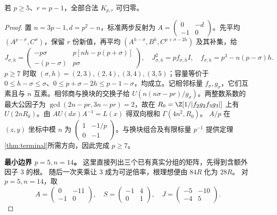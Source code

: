 \begin{lemma}\label{lem:upper-boundary}
若 $p\ge5$、$r=p-1$，全部合法 $K_{p,r}$ 可归零。
\end{lemma}
\begin{proof}
置 $n=3p-1,d=p^2-n$，标准两步反射为 $A=\left(\begin{smallmatrix}0&-d\\-1&0\end{smallmatrix}\right)$。先平均 $(A^{p-\sigma},C^\sigma)$，保留 $r$ 份新值，再平均 $(A^{h-\sigma},B^h,C^{p+\sigma-2h})$ 及其补集，给
\[
J_{\sigma,h}=\begin{pmatrix}-p\sigma&p[nh-p(p+\sigma)]\\-(p-\sigma)&p\sigma\end{pmatrix},
\quad J_{\sigma,h}^2=pf_{\sigma,h}I,\quad f_{\sigma,h}=p^3-n(p-\sigma)h.
\]
$p\ge7$ 时取 $(\sigma,h)=(2,3),(2,4),(3,4),(3,5)$；容量等价于 $0\le h-\sigma\le\sigma$、$0\le p+\sigma-2h\le p-1-\sigma$，均成立。记相邻标量 $f_\sigma,g_\sigma$，它们互素且与 $n$ 互素。相邻商与换块的交换子给 $U(n(n\sigma-pr)/g_\sigma)$。两整数系数的最大公因子为 $\gcd(2n-pr,3n-pr)=2$，故在 $R_0=\Z[1/|f_2g_2f_3g_3|]$ 上有 $U(2nR_0)$。由 $AU(dx)A^{-1}=L(x)$ 得双向根和 $\Gamma(4n^2,R_0)$。
$A/p$ 在 $(z,y)$ 坐标中模 $n$ 为 $\left(\begin{smallmatrix}1&-1/p\\0&-1\end{smallmatrix}\right)$。与换块组合及有限标量 $p^{-1}$ 提供定理\ref{thm:terminal}所需方向，因此完成 $p\ge7$。

\par\noindent\textbf{最小边界 $p=5,n=14$。}
这里直接列出三个已有真实分组的矩阵，先得到含额外因子 $3$ 的根。
随后一次夹乘让 $3$ 成为可逆倍率，根理想便由 $84R$ 化为 $28R$。
对 $p=5,n=14$，取
\[
A=\begin{pmatrix}0&-11\\-1&0\end{pmatrix},\quad
S=\begin{pmatrix}-1&4\\0&1\end{pmatrix},\quad
J=\begin{pmatrix}-5&-10\\-4&5\end{pmatrix}.
\]


\end{proof}
